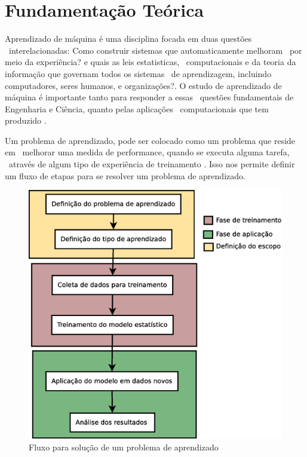 \chapter{Fundamentação Teórica}

Aprendizado de máquina é uma disciplina focada em duas questões \
interelacionadas: Como construir sistemas que automaticamente melhoram \
por meio da experiência? e quais as leis estatisticas, \
computacionais e da teoria da informação que governam todos os sistemas \
de aprendizagem, incluindo computadores, seres humanos, e organizações?.
O estudo de aprendizado de máquina é importante tanto para responder a essas \
questões fundamentais de Engenharia e Ciência, quanto pelas aplicações \
computacionais que tem produzido \cite{Jordan}.

Um problema de aprendizado, pode ser colocado como um problema que reside em \
melhorar uma medida de performance, quando se executa alguma tarefa, \
através de algum tipo de experiência de treinamento \cite{Jordan}. Isso nos permite definir um fluxo de etapas para se resolver um problema de aprendizado.

\begin{figure}[h]
	\centering
	\label{fluxo_treinamento}
        \includegraphics[scale=0.40]{figuras/fluxo_treinamento.eps}
	\caption{Fluxo para solução de um problema de aprendizado}
\end{figure}


